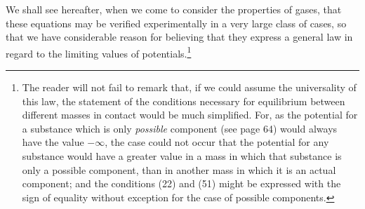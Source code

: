 \documentclass[12pt]{memoir}
\begin{document}
We shall see hereafter, when we come to consider the properties of gases, that these equations may be verified experimentally in a very large class of cases, so that we have considerable reason for believing that they express a general law in regard to the limiting values of potentials.\footnote{The reader will not fail to remark that, if we could assume the universality of this law, the statement of the conditions necessary for equilibrium between different masses in contact would be much simplified. For, as the potential for a substance which is only \textit{possible} component (see page 64) would always have the value $-\infty$, the case could not occur that the potential for any substance would have a greater value in a mass in which that substance is only a possible component, than in another mass in which it is an actual component; and the conditions (22) and (51) might be expressed with the sign of equality without exception for the case of possible components.}

\end{document}
